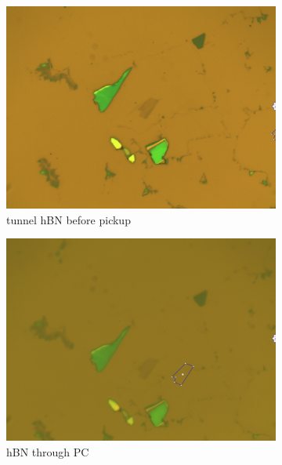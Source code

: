 \begin{figure}[H]
	\centering
	\begin{subfigure}[b]{0.4\textwidth}
		\centering
		\includegraphics[width=\textwidth]{figures/hbn_before_pickup.jpg}
		\caption{tunnel hBN before pickup}
	\end{subfigure}
	\qquad
	\begin{subfigure}[b]{0.4\textwidth}
		\centering
		\includegraphics[width=\textwidth]{figures/hbn_through_pc.jpg}
		\caption{hBN through PC}
	\end{subfigure}
	\begin{subfigure}[b]{0.4\textwidth}
		\centering

\end{subfigure}
\end{figure}
